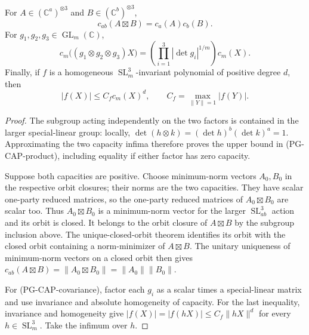 \begin{lemma}
\label{pg:cap-product}
For $A\in(\mathbb C^a)^{\otimes3}$ and
$B\in(\mathbb C^b)^{\otimes3}$,
\[
 c_{ab}(A\boxtimes B)=c_a(A)c_b(B).
 \tag{PG-CAP-product}
\]
For $g_1,g_2,g_3\in\operatorname{GL}_m(\mathbb C)$,
\[
 c_m\bigl((g_1\otimes g_2\otimes g_3)X\bigr)
 =\left(\prod_{i=1}^3|\det g_i|^{1/m}\right)c_m(X).
 \tag{PG-CAP-covariance}
\]
Finally, if $f$ is a homogeneous $\operatorname{SL}_m^3$-invariant
polynomial of positive degree $d$, then
\[
 |f(X)|\leq C_f c_m(X)^d,
 \qquad C_f=\max_{\|Y\|=1}|f(Y)|.
 \tag{PG-CAP-invariant}
\]
\end{lemma}
\begin{proof}
The subgroup acting independently on the two factors is contained
in the larger special-linear group: locally,
$\det(h\otimes k)=(\det h)^b(\det k)^a=1$.
Approximating the two capacity infima therefore proves the upper
bound in (PG-CAP-product), including equality if either factor has
zero capacity.

Suppose both capacities are positive. Choose minimum-norm vectors
$A_0,B_0$ in the respective orbit closures; their norms are the two
capacities. They have scalar one-party reduced matrices, so the
one-party reduced matrices of $A_0\boxtimes B_0$ are scalar too.
Thus $A_0\boxtimes B_0$ is a minimum-norm vector for the larger
$\operatorname{SL}_{ab}^3$ action and its orbit is closed. It belongs
to the orbit closure of $A\boxtimes B$ by the subgroup inclusion
above. The unique-closed-orbit theorem identifies its orbit with the
closed orbit containing a norm-minimizer of $A\boxtimes B$.
The unitary uniqueness of minimum-norm vectors on a closed orbit
then gives
$c_{ab}(A\boxtimes B)=\|A_0\boxtimes B_0\|
=\|A_0\|\|B_0\|$.

For (PG-CAP-covariance), factor each $g_i$ as a scalar times a
special-linear matrix and use invariance and absolute homogeneity
of capacity. For the last inequality, invariance and homogeneity
give $|f(X)|=|f(hX)|\leq C_f\|hX\|^d$ for every
$h\in\operatorname{SL}_m^3$. Take the infimum over $h$.
\end{proof}

